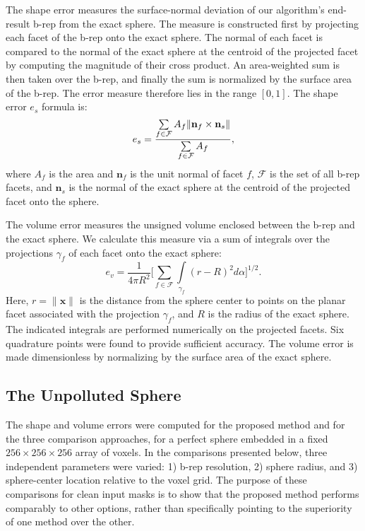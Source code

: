 The shape error measures the surface-normal deviation of our algorithm's end-result b-rep from the exact sphere. The measure is constructed first by projecting each facet of the b-rep onto the exact sphere. The normal of each facet is compared to the normal of the exact sphere at the centroid of the projected facet by computing the magnitude of their cross product. An area-weighted sum is then taken over the b-rep, and finally the sum is normalized by the surface area of the b-rep. The error measure therefore lies in the range $\left [0,1\right]$. The shape error $e_s$ formula is:
\begin{equation} 
	e_s = \frac{ \sum \limits_{f\in\mathcal{F}} A_f \lVert {\bf n}_f \times {\bf n}_s \rVert}{\sum \limits_{f\in\mathcal{F}} A_f},
\end{equation}
where $A_f$ is the area and ${\bm n}_f$ is the unit normal of facet $f$, $\mathcal{F}$ is the set of all b-rep facets, and ${\bm n}_s$ is the normal of the exact sphere at the centroid of the projected facet onto the sphere.

The volume error measures the unsigned volume enclosed between the b-rep and the exact sphere. We calculate this measure via a sum of integrals over the projections $\gamma_f$ of each facet onto the exact sphere: 
\begin{equation}
\label{vol err}
	e_v = \frac{1}{4\pi R^2} \Big[\sum \limits_{f \in \mathcal{F}} \int \limits_{\gamma_f} (r - R)^2 d\alpha \Big]^{1/2} .
\end{equation}
Here, $r = \lVert {\bm x} \rVert$ is the distance from the sphere center to points on the planar facet associated with the projection $\gamma_f$, and $R$ is the radius of the exact sphere.  The indicated integrals are performed numerically on the projected facets. Six quadrature points were found to provide sufficient accuracy. The volume error is made dimensionless by normalizing by the surface area of the exact sphere.
\subsection{The Unpolluted Sphere}
\label{The Unpolluted Sphere}

The shape and volume errors were computed for the proposed method and for the three comparison approaches, for a perfect sphere embedded in a fixed $256 \times 256 \times 256$ array of voxels.  In the comparisons presented below, three independent parameters were varied:  1) b-rep resolution, 2) sphere radius, and 3) sphere-center location relative to the voxel grid. The purpose of these comparisons for clean input masks is to show that the proposed method performs comparably to other options, rather than specifically pointing to the superiority of one method over the other.

